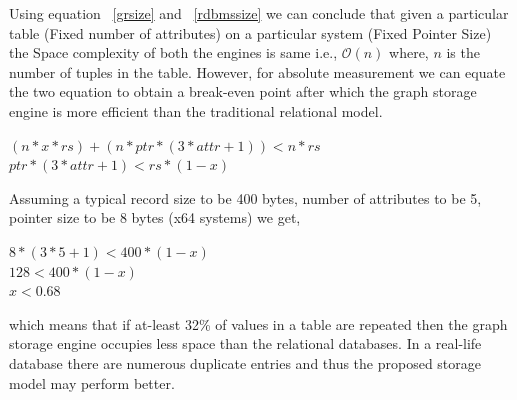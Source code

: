\documentclass[12pt, oneside]{book}
\begin{document}
\par
Using equation ~\ref{grsize} and ~\ref{rdbmssize} we can conclude that given a particular table (Fixed number of attributes) on a particular system (Fixed Pointer Size) the Space complexity of both the engines is same i.e., $\mathcal{O}\left( n\right)$ where, $n$ is the number of tuples in the table. However, for absolute measurement we can equate the two equation to obtain a break-even point after which the graph storage engine is more efficient than the traditional relational model. 
\begin{center}
  \begin{math}
    (n * x * rs) + (n * ptr * (3 * attr + 1)) < n * rs
  \end{math}\\
  \begin{math}
    ptr * (3 * attr + 1) < rs * (1 - x)
  \end{math}
\end{center}
Assuming a typical record size to be 400 bytes, number of attributes to be 5, pointer size to be 8 bytes (x64 systems) we get,
\begin{center}
 \begin{math}
  8 * (3 * 5 + 1) < 400 * (1 - x)
 \end{math} \\
 \begin{math}
  128 < 400 * (1-x)
 \end{math} \\
 \begin{math}
  x < 0.68
 \end{math}
\end{center}
which means that if at-least 32\% of values in a table are repeated then the graph storage engine occupies less space than the relational databases. In a real-life database there are numerous duplicate entries and thus the proposed storage model may perform better.
\end{document}
